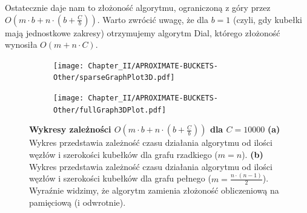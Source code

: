 Ostatecznie daje nam to złożoność algorytmu, ograniczoną z góry przez $ O \left( m \cdot b + n \cdot \left( b + \frac{C}{b}\right)\right)$. Warto zwrócić uwagę, że dla $b=1$ (czyli, gdy kubełki mają jednostkowe zakresy) otrzymujemy algorytm Dial, którego złożoność wynosiła $ O \left( m + n \cdot C \right)$.

\begin{figure}[!htbp]
	\centering
	\begin{subfigure}[b]{0.45\textwidth}
		\texttt{[image: Chapter\_II/APROXIMATE-BUCKETS-Other/sparseGraphPlot3D.pdf]}
		\caption{}
	\end{subfigure}
	\qquad
	\begin{subfigure}[b]{0.45\textwidth}
		\texttt{[image: Chapter\_II/APROXIMATE-BUCKETS-Other/fullGraph3DPlot.pdf]}
		\caption{}
	\end{subfigure}
	\caption{\textbf{Wykresy zależności $ O \left( m \cdot b + n \cdot \left( b + \frac{C}{b} \right) \right) $ dla $C = 10000$ } \textbf{(a)} Wykres przedstawia zależność czasu działania algorytmu od ilości węzłów i szerokości kubełków dla grafu rzadkiego ($ m = n $). \textbf{(b)} Wykres przedstawia zależność czasu działania algorytmu od ilości węzłów i szerokości kubełków dla grafu pełnego ($ m = \frac{n \cdot \left( n - 1\right)}{2}$). Wyraźnie widzimy, że algorytm zamienia złożoność obliczeniową na pamięciową (i odwrotnie). }\label{fig:plotAproximateBucketsComplexity}
\end{figure}

